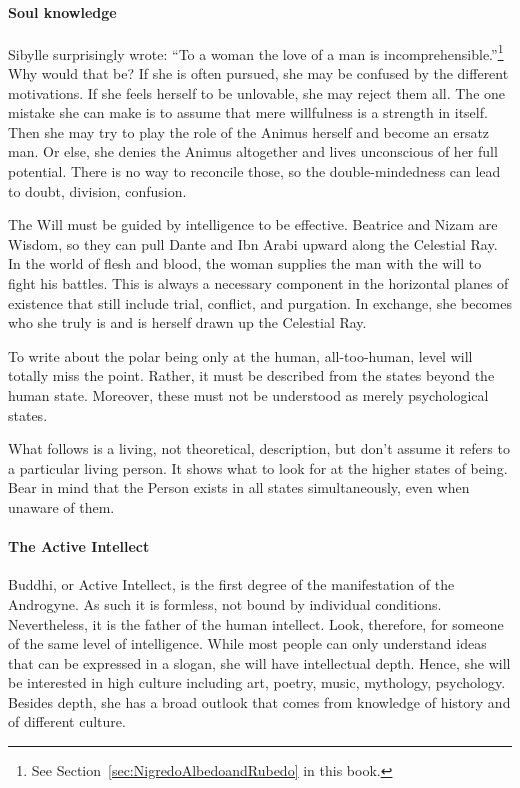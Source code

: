 \paragraph{Soul knowledge}
Sibylle surprisingly wrote: “To a woman the love of a man is incomprehensible.”\footnote{See Section~\ref{sec:NigredoAlbedoandRubedo} in this book.} Why would that be? If she is often pursued, she may be confused by the different motivations. If she feels herself to be unlovable, she may reject them all. The one mistake she can make is to assume that mere willfulness is a strength in itself. Then she may try to play the role of the Animus herself and become an ersatz man. Or else, she denies the Animus altogether and lives unconscious of her full potential. There is no way to reconcile those, so the double-mindedness can lead to doubt, division, confusion.

The Will must be guided by intelligence to be effective. Beatrice and Nizam are Wisdom, so they can pull Dante and Ibn Arabi upward along the Celestial Ray. In the world of flesh and blood, the woman supplies the man with the will to fight his battles. This is always a necessary component in the horizontal planes of existence that still include trial, conflict, and purgation. In exchange, she becomes who she truly is and is herself drawn up the Celestial Ray.

To write about the polar being only at the human, all-too-human, level will totally miss the point. Rather, it must be described from the states beyond the human state. Moreover, these must not be understood as merely psychological states.

What follows is a living, not theoretical, description, but don't assume it refers to a particular living person. It shows what to look for at the higher states of being. Bear in mind that the Person exists in all states simultaneously, even when unaware of them.

\paragraph{The Active Intellect}
Buddhi, or Active Intellect, is the first degree of the manifestation of the Androgyne. As such it is formless, not bound by individual conditions. Nevertheless, it is the father of the human intellect. Look, therefore, for someone of the same level of intelligence. While most people can only understand ideas that can be expressed in a slogan, she will have intellectual depth. Hence, she will be interested in high culture including art, poetry, music, mythology, psychology. Besides depth, she has a broad outlook that comes from knowledge of history and of different culture.

